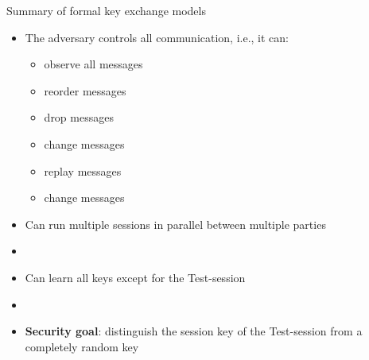 \documentclass[xcolor={dvipsnames},screen,compress]{beamer}
\begin{document}
\begin{frame}{Summary of formal key exchange models}
	\begin{itemize}
		\item The adversary controls all communication, i.e., it can:
		
		\begin{itemize}
			\item observe all messages
			\item reorder messages
			\item drop messages
			\item change messages
			\item replay messages
			\item change messages
		\end{itemize} 
		
		\item Can run multiple sessions in parallel between multiple parties
		
		\item[]
		
		\item Can learn all keys except for the Test-session
		
		\item[]
		
		\item \textbf{Security goal}: distinguish the session key of the Test-session
		from a completely random key
		
	\end{itemize}
\end{frame}
\end{document}
